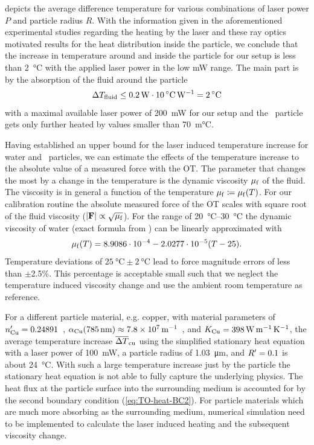  depicts the average difference temperature for various 
combinations of laser power $P$ and particle radius $R$. With the information 
given in the aforementioned experimental studies regarding the heating by the 
laser and these ray optics motivated results for the heat distribution inside 
the particle, we conclude that the increase in temperature around and inside 
the particle for our setup is less than \SI{2}{\degreeCelsius} with the applied 
laser power in the low \si{\milli\watt} range. The main part is by the 
absorption of the fluid around the particle \begin{equation}
  \Delta T_{\mathrm{fluid}}
  \leq
  \SI{0.2}{\watt}\cdot\SI{10}{\celsius\per\watt}
  =
  \SI{2}{\celsius}
\end{equation}
with a maximal available laser power of \SI{200}{\milli\watt} for our setup and 
the \SiO~particle gets only further heated by values smaller than 
\SI{70}{\milli\celsius}.

Having established an upper bound for the laser induced temperature increase 
for water and \SiO~particles, we can estimate the effects of the temperature 
increase to the absolute value of a measured force with the OT. The parameter 
that changes the most by a change in the temperature is the dynamic viscosity 
$\mu_{\mathrm{f}}$ of the fluid. The viscosity is in general a function of the temperature 
$\mu_{\mathrm{f}}\coloneqq\mu_{\mathrm{f}}(T)$. For our calibration routine the absolute measured 
force of the OT scales with square root of the fluid viscosity 
($\abs{\vb{F}}\propto\sqrt{\mu_{\mathrm{f}}}$). For the range of 
\SIrange{20}{30}{\degreeCelsius} the dynamic viscosity of water (exact formula 
from \cite{Peterman2003}) can be linearly approximated with
\begin{equation}
  \mu_{\mathrm{f}}(T) = 8.9086\cdot 10^{-4} -2.0277\cdot10^{-5} (T-25).
  \label{eq:TO-viscosity}
\end{equation}
Temperature deviations of $\SI{25}{\degreeCelsius}\pm\SI{2}{\degreeCelsius}$ 
lead to force magnitude errors of less than $\pm$2.5\%. This percentage is 
acceptable small such that we neglect the temperature induced viscosity change 
and use the ambient room temperature as reference.

For a different particle material, e.g. copper, with material parameters of 
$n^{\prime}_{\mathrm{Cu}}=0.24891$~\cite{Johnson1972}, 
$\alpha_{\MR{Cu}}(\SI{785}{\nm})\approx\SI{7.8e7}{\per\meter}$~\cite{Johnson1972}, 
and $K_{\mathrm{Cu}}=\SI{398}{\watt\per\meter\per\kelvin}$, the average temperature 
increase $\overline{\Delta T}_{\mathrm{cu}}$ using the simplified stationary heat 
equation with a laser power of \SI{100}{\milli\watt}, a particle radius of 
\SI{1.03}{\um}, and $R^{\prime}=0.1$ is about \SI{24}{\degreeCelsius}. With such a 
large temperature increase just by the particle the stationary heat equation is 
not able to fully capture the underlying physics. The heat flux at the particle 
surface into the surrounding medium is accounted for by the second boundary 
condition (\cref{eq:TO-heat-BC2}). For particle materials which are much more 
absorbing as the surrounding medium, numerical simulation need to be 
implemented to calculate the laser induced heating and the subsequent viscosity 
change.

